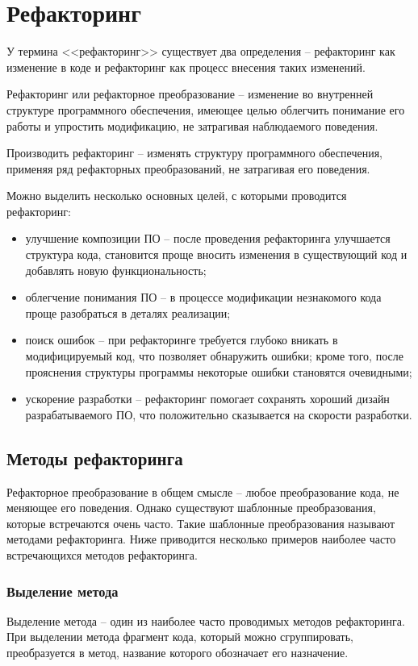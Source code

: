 \section{Рефакторинг}
У термина <<рефакторинг>> существует два определения -- рефакторинг как изменение в коде и рефакторинг как процесс внесения таких изменений.
\begin{definition}
Рефакторинг или рефакторное преобразование -- изменение во внутренней структуре программного обеспечения,
имеющее целью облегчить понимание его работы и упростить модификацию, не затрагивая наблюдаемого поведения.
\end{definition}
\begin{definition}
Производить рефакторинг -- изменять структуру программного обеспечения, применяя
ряд рефакторных преобразований, не затрагивая его поведения.
\end{definition}
Можно выделить несколько основных целей, с которыми проводится рефакторинг:
\begin{itemize}
    \item улучшение композиции ПО -- после проведения рефакторинга улучшается структура кода,
    становится проще вносить изменения в существующий код и добавлять новую функциональность;
    \item облегчение понимания ПО -- в процессе модификации незнакомого кода проще разобраться в деталях реализации;
    \item поиск ошибок -- при рефакторинге требуется глубоко вникать в модифицируемый код, что позволяет обнаружить ошибки;
    кроме того, после прояснения структуры программы некоторые ошибки становятся очевидными;
    \item ускорение разработки -- рефакторинг помогает сохранять хороший дизайн разрабатываемого ПО,
    что положительно сказывается на скорости разработки.
\end{itemize}
\subsection{Методы рефакторинга}
Рефакторное преобразование в общем смысле -- любое преобразование кода, не меняющее его поведения.
Однако существуют шаблонные преобразования, которые встречаются очень часто.
Такие шаблонные преобразования называют методами рефакторинга.
Ниже приводится несколько примеров наиболее часто встречающихся методов рефакторинга.
\subsubsection{Выделение метода}
Выделение метода -- один из наиболее часто проводимых методов рефакторинга.
При выделении метода фрагмент кода, который можно сгруппировать, преобразуется в метод,
название которого обозначает его назначение.

